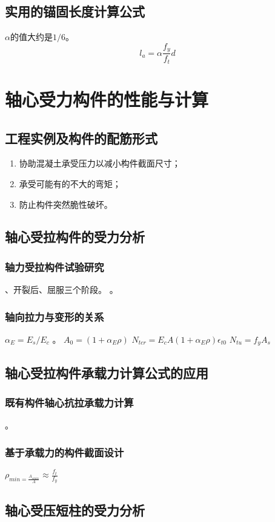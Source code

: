 \documentclass{article}
\begin{document}
\subsection{实用的锚固长度计算公式}
$\alpha$的值大约是$1/6$。
$$l_a=\alpha \frac{f_y}{f_t}d$$
\section{轴心受力构件的性能与计算}
\subsection{工程实例及构件的配筋形式}
\begin{enumerate}
    \item 协助混凝土承受压力以减小构件截面尺寸；
    \item 承受可能有的不大的弯矩；
    \item 防止构件突然脆性破坏。
\end{enumerate}
\subsection{轴心受拉构件的受力分析}
\subsubsection{轴力受拉构件试验研究}
、开裂后、屈服三个阶段。
。
\subsubsection{轴向拉力与变形的关系}
$\alpha_E=E_s/E_c$
。
$A_0=(1+\alpha_E\rho)$
$N_{tcr}=E_cA(1+\alpha_E\rho)\epsilon_{t0}$
$N_{tu}=f_yA_s$
\subsection{轴心受拉构件承载力计算公式的应用}
\subsubsection{既有构件轴心抗拉承载力计算}
。
\subsubsection{基于承载力的构件截面设计}
$\rho_{min=\frac{A_{smin}}{A}}\approx\frac{f_t}{f_y}$
\subsection{轴心受压短柱的受力分析}
\end{document}
